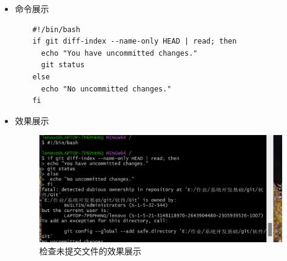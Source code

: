 \documentclass[UTF8]{ctexart}
\begin{document}
\begin{itemize}
  \item 命令展示
  \begin{verbatim}
    #!/bin/bash
    if git diff-index --name-only HEAD | read; then
      echo "You have uncommitted changes."
      git status
    else
      echo "No uncommitted changes."
    fi
  \end{verbatim}

  \item 效果展示
  \begin{figure}[H]
    \centering
    \includegraphics[width=\textwidth]{24} %
    \caption{检查未提交文件的效果展示}
    \label{fig:uncommitted-changes}
  \end{figure}
\end{itemize}
\end{document}
